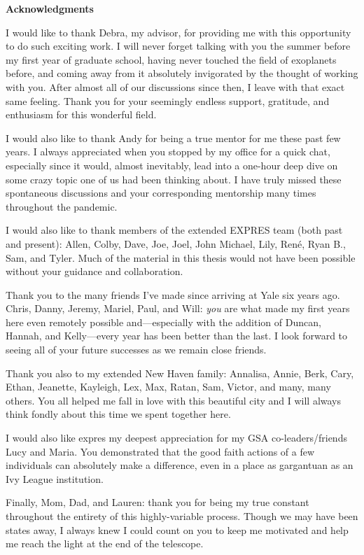 \begin{center}
{\bf \large Acknowledgments}
\end{center}

I would like to thank Debra, my advisor, for providing me with this opportunity to do such exciting work. I will never forget talking with you the summer before my first year of graduate school, having never touched the field of exoplanets before, and coming away from it absolutely invigorated by the thought of working with you. After almost all of our discussions since then, I leave with that exact same feeling. Thank you for your seemingly endless support, gratitude, and enthusiasm for this wonderful field.

I would also like to thank Andy for being a true mentor for me these past few years. I always appreciated when you stopped by my office for a quick chat, especially since it would, almost inevitably, lead into a one-hour deep dive on some crazy topic one of us had been thinking about. I have truly missed these spontaneous discussions and your corresponding mentorship many times throughout the pandemic.

I would also like to thank members of the extended EXPRES team (both past and present): Allen, Colby, Dave, Joe, Joel, John Michael, Lily, Ren\'e, Ryan B., Sam, and Tyler. Much of the material in this thesis would not have been possible without your guidance and collaboration.

Thank you to the many friends I've made since arriving at Yale six years ago. Chris, Danny, Jeremy, Mariel, Paul, and Will: \textit{you} are what made my first years here even remotely possible and---especially with the addition of Duncan, Hannah, and Kelly---every year has been better than the last. I look forward to seeing all of your future successes as we remain close friends.

Thank you also to my extended New Haven family: Annalisa, Annie, Berk, Cary, Ethan, Jeanette, Kayleigh, Lex, Max, Ratan, Sam, Victor, and many, many others. You all helped me fall in love with this beautiful city and I will always think fondly about this time we spent together here.

I would also like expres my deepest appreciation for my GSA co-leaders/friends Lucy and Maria. You demonstrated that the good faith actions of a few individuals can absolutely make a difference, even in a place as gargantuan as an Ivy League institution.

Finally, Mom, Dad, and Lauren: thank you for being my true constant throughout the entirety of this highly-variable process. Though we may have been states away, I always knew I could count on you to keep me motivated and help me reach the light at the end of the telescope.